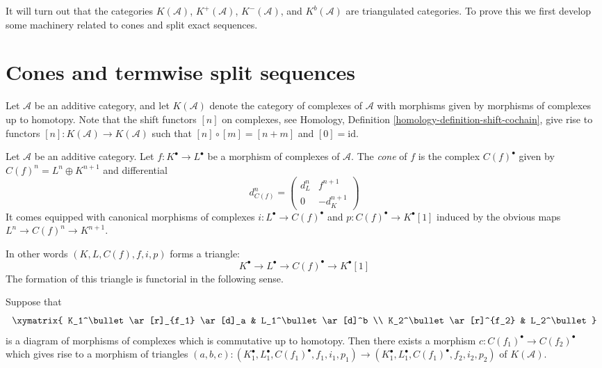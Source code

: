 \noindent
It will turn out that the categories $K(\mathcal{A})$,
$K^{+}(\mathcal{A})$, $K^{-}(\mathcal{A})$, and $K^b(\mathcal{A})$
are triangulated categories. To prove this we first develop
some machinery related to cones and split exact sequences.




\section{Cones and termwise split sequences}
\label{section-cones}

\noindent
Let $\mathcal{A}$ be an additive category, and let
$K(\mathcal{A})$ denote the category of complexes of
$\mathcal{A}$ with morphisms given by morphisms of
complexes up to homotopy. Note that the shift functors
$[n]$ on complexes, see
Homology, Definition \ref{homology-definition-shift-cochain},
give rise to functors $[n] : K(\mathcal{A}) \to K(\mathcal{A})$
such that $[n] \circ [m] = [n + m]$ and $[0] = \text{id}$.

\begin{definition}
\label{definition-cone}
Let $\mathcal{A}$ be an additive category.
Let $f : K^\bullet \to L^\bullet$ be a morphism of
complexes of $\mathcal{A}$. The {\it cone} of $f$
is the complex $C(f)^\bullet$ given by
$C(f)^n = L^n \oplus K^{n + 1}$ and
differential
$$
d_{C(f)}^n =
\left(
\begin{matrix}
d^n_L & f^{n + 1} \\
0 & -d_K^{n + 1}
\end{matrix}
\right)
$$
It comes equipped with canonical morphisms of complexes
$i : L^\bullet \to C(f)^\bullet$ and $p : C(f)^\bullet \to K^\bullet[1]$
induced by the obvious maps $L^n \to C(f)^n \to K^{n + 1}$.
\end{definition}

\noindent
In other words $(K, L, C(f), f, i, p)$ forms a triangle:
$$
K^\bullet \to L^\bullet \to C(f)^\bullet \to K^\bullet[1]
$$
The formation of this triangle is
functorial in the following sense.

\begin{lemma}
\label{lemma-functorial-cone}
Suppose that
$$
\xymatrix{
K_1^\bullet \ar[r]_{f_1} \ar[d]_a & L_1^\bullet \ar[d]^b \\
K_2^\bullet \ar[r]^{f_2} & L_2^\bullet
}
$$
is a diagram of morphisms of complexes which is commutative
up to homotopy. Then there exists a morphism
$c : C(f_1)^\bullet \to C(f_2)^\bullet$ which gives rise to
a morphism of triangles
$(a, b, c) : (K_1^\bullet, L_1^\bullet, C(f_1)^\bullet, f_1, i_1, p_1)
\to
(K_1^\bullet, L_1^\bullet, C(f_1)^\bullet, f_2, i_2, p_2)$
of $K(\mathcal{A})$.
\end{lemma}

